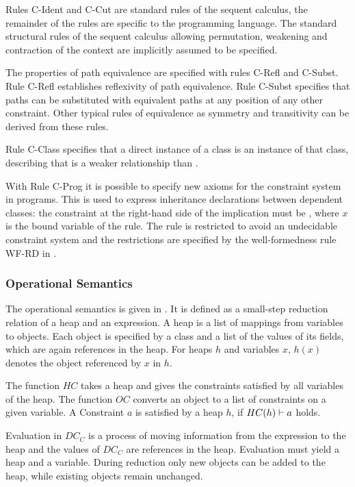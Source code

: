 Rules C-Ident and C-Cut are standard rules of the sequent calculus,
the remainder of the rules are specific to the programming language.
The standard structural rules of the sequent calculus allowing
permutation, weakening and contraction of the context
are implicitly assumed to be specified.

The properties of path equivalence are specified with rules C-Refl and C-Subst.
Rule C-Refl establishes reflexivity of path equivalence.
Rule C-Subst specifies that paths can be substituted with equivalent paths
at any position of any other constraint.
Other typical rules of equivalence as symmetry and transitivity can be
derived from these rules.

Rule C-Class specifies that a direct instance of a class
is an instance of that class, describing that
 is a weaker relationship than .

With Rule C-Prog it is possible to specify new axioms for the constraint system in programs.
This is used to express inheritance declarations between dependent classes:
the constraint at the right-hand side of the implication must be ,
where $x$ is the bound variable of the rule.
The rule is restricted to avoid an undecidable constraint system
and the restrictions are specified by the well-formedness rule WF-RD in .

\subsubsection{Operational Semantics}
The operational semantics is given in .
It is defined as a small-step reduction relation of a heap and an expression.
A heap is a list of mappings from variables to objects.
Each object is specified by a class and a list of the values of its fields,
which are again references in the heap.
For heaps $h$ and variables $x$, $h(x)$ denotes the object referenced by $x$ in $h$.

The function $HC$ takes a heap and gives the constraints satisfied by all variables of the heap.
The function $OC$ converts an object %
to a list of constraints on a given variable.
A Constraint $a$ is satisfied by a heap $h$, if $HC(h) \vdash a$ holds.

Evaluation in $DC_C$ is a process of moving information from the expression to the heap
and the values of $DC_C$ are references in the heap.
Evaluation must yield a heap and a variable.
During reduction only new objects can be added to the heap,
while existing objects remain unchanged.

